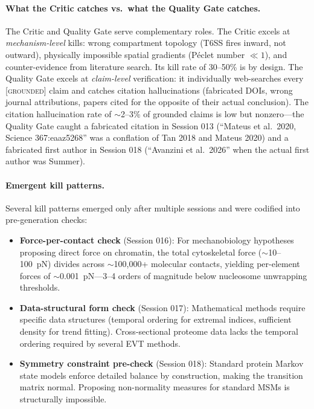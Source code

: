 \paragraph{What the Critic catches vs.\ what the Quality Gate catches.} The Critic and Quality Gate serve complementary roles. The Critic excels at \emph{mechanism-level} kills: wrong compartment topology (T6SS fires inward, not outward), physically impossible spatial gradients (P\'{e}clet number $\ll 1$), and counter-evidence from literature search. Its kill rate of 30--50\% is by design. The Quality Gate excels at \emph{claim-level} verification: it individually web-searches every \textsc{[grounded]} claim and catches citation hallucinations (fabricated DOIs, wrong journal attributions, papers cited for the opposite of their actual conclusion). The citation hallucination rate of $\sim$2--3\% of grounded claims is low but nonzero---the Quality Gate caught a fabricated citation in Session 013 (``Mateus et al.\ 2020, Science 367:eaaz5268'' was a conflation of Tan 2018 and Mateus 2020) and a fabricated first author in Session 018 (``Avanzini et al.\ 2026'' when the actual first author was Summer).

\paragraph{Emergent kill patterns.} Several kill patterns emerged only after multiple sessions and were codified into pre-generation checks:
\begin{itemize}
    \item \textbf{Force-per-contact check} (Session 016): For mechanobiology hypotheses proposing direct force on chromatin, the total cytoskeletal force ($\sim$10--100~pN) divides across $\sim$100{,}000+ molecular contacts, yielding per-element forces of $\sim$0.001~pN---3--4 orders of magnitude below nucleosome unwrapping thresholds.
    \item \textbf{Data-structural form check} (Session 017): Mathematical methods require specific data structures (temporal ordering for extremal indices, sufficient density for trend fitting). Cross-sectional proteome data lacks the temporal ordering required by several EVT methods.
    \item \textbf{Symmetry constraint pre-check} (Session 018): Standard protein Markov state models enforce detailed balance by construction, making the transition matrix normal. Proposing non-normality measures for standard MSMs is structurally impossible.
\end{itemize}

